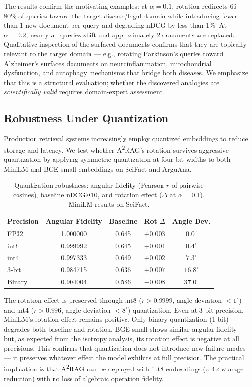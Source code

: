 \documentclass{article}
\begin{document}
The results confirm the motivating examples: at $\alpha = 0.1$, rotation redirects 66--80\% of queries toward the target disease/legal domain while introducing fewer than 1 new document per query and degrading nDCG by less than 1\%. At $\alpha = 0.2$, nearly all queries shift and approximately 2 documents are replaced. Qualitative inspection of the surfaced documents confirms that they are topically relevant to the target domain --- e.g., rotating Parkinson's queries toward Alzheimer's surfaces documents on neuroinflammation, mitochondrial dysfunction, and autophagy mechanisms that bridge both diseases. We emphasize that this is a structural evaluation; whether the discovered analogies are \emph{scientifically valid} requires domain-expert assessment.

\subsection{Robustness Under Quantization}

Production retrieval systems increasingly employ quantized embeddings to reduce storage and latency. We test whether A\textsuperscript{2}RAG's rotation survives aggressive quantization by applying symmetric quantization at four bit-widths to both MiniLM and BGE-small embeddings on SciFact and ArguAna.

\begin{table}[ht]
\centering
\caption{Quantization robustness: angular fidelity (Pearson $r$ of pairwise cosines), baseline nDCG@10, and rotation effect ($\Delta$ at $\alpha = 0.1$). MiniLM results on SciFact.}
\label{tab:quantization}
\small
\begin{tabular}{lcccc}
\toprule
Precision & Angular Fidelity & Baseline & Rot $\Delta$ & Angle Dev. \\
\midrule
FP32 & 1.000000 & 0.645 & $+0.003$ & $0.0^{\circ}$ \\
int8 & 0.999992 & 0.645 & $+0.004$ & $0.4^{\circ}$ \\
int4 & 0.997333 & 0.649 & $+0.002$ & $7.3^{\circ}$ \\
3-bit & 0.984715 & 0.636 & $+0.007$ & $16.8^{\circ}$ \\
Binary & 0.904004 & 0.586 & $-0.008$ & $37.0^{\circ}$ \\
\bottomrule
\end{tabular}
\end{table}

The rotation effect is preserved through int8 ($r > 0.9999$, angle deviation $< 1^{\circ}$) and int4 ($r > 0.996$, angle deviation $< 8^{\circ}$) quantization. Even at 3-bit precision, MiniLM's rotation effect remains positive. Only binary quantization (1-bit) degrades both baseline and rotation. BGE-small shows similar angular fidelity but, as expected from the isotropy analysis, its rotation effect is negative at all precisions. This confirms that quantization does not introduce new failure modes --- it preserves whatever effect the model exhibits at full precision. The practical implication is that A\textsuperscript{2}RAG can be deployed with int8 embeddings (a 4$\times$ storage reduction) with no loss of algebraic operation fidelity.
\end{document}
